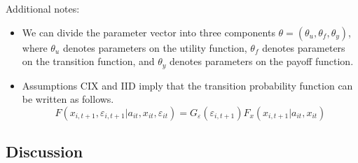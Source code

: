\documentclass[11pt]{article}
\begin{document}
Additional notes:
\begin{itemize}
    \item We can divide the parameter vector into three components $\theta = (\theta_u,\theta_f,\theta_y)$, where $\theta_u$ denotes parameters on the utility function, $\theta_f$ denotes parameters on the transition function, and $\theta_y$ denotes parameters on the payoff function.
    \item Assumptions CIX and IID imply that the transition probability function can be written as follows.
    \begin{equation*}
        F(x_{i,t+1},\varepsilon_{i,t+1}|a_{it},x_{it},\varepsilon_{it}) = G_\varepsilon(\varepsilon_{i,t+1})F_x(x_{i,t+1}|a_{it},x_{it})
    \end{equation*}
\end{itemize}

\subsection{Discussion}
\end{document}
